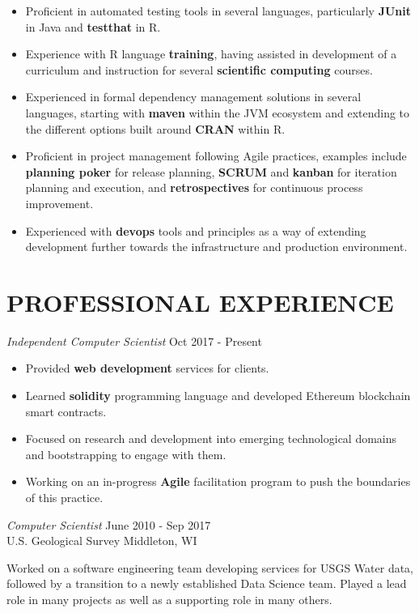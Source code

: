 \documentclass[line,margin]{res}
\begin{document}
\begin{resume}
\begin{itemize}
	\item Proficient in automated testing tools in several languages, particularly \textbf{JUnit} in Java and \textbf{testthat} in R.
	\item Experience with R language \textbf{training}, having assisted in development of a curriculum and instruction for several \textbf{scientific computing} courses.
	\item Experienced in formal dependency management solutions in several languages, starting with \textbf{maven} within the JVM ecosystem and extending to the different options built around \textbf{CRAN} within R.
	\item Proficient in project management following Agile practices, examples include \textbf{planning poker} for release planning, \textbf{SCRUM} and \textbf{kanban} for iteration planning and execution, and \textbf{retrospectives} for continuous process improvement.
	\item Experienced with \textbf{devops} tools and principles as a way of extending development further towards the infrastructure and production environment.
\end{itemize}
 
\section{PROFESSIONAL EXPERIENCE}
		{\sl Independent Computer Scientist} \hfill Oct 2017 - Present \\
		\begin{itemize} \itemsep -2pt %
			\item Provided \textbf{web development} services for clients.
			\item Learned \textbf{solidity} programming language and developed Ethereum blockchain smart contracts.
			\item Focused on research and development into emerging technological domains and bootstrapping to engage with them.
			\item Working on an in-progress \textbf{Agile} facilitation program to push the boundaries of this practice.
		\end{itemize}

		{\sl Computer Scientist} \hfill June 2010 - Sep 2017 \\
		U.S. Geological Survey \hfill Middleton, WI

		Worked on a software engineering team developing services for USGS Water data, followed by a transition to a newly established Data Science team.  Played a lead role in many projects as well as a supporting role in many others. 


\end{resume}
\end{document}
